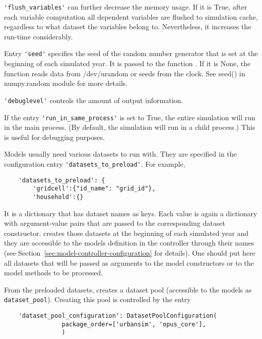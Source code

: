 \verb|'flush_variables'| can further decrease the memory usage.  If it is True, after each variable
computation all dependent variables are flushed to simulation
cache, regardless to what dataset the variables belong to.
Nevertheless, it increases the run-time considerably.

Entry \verb|'seed'| specifies the seed of the random number generator that is set at
the beginning of each simulated year. It is passed to the  
function . If it is None, the function reads data from /dev/urandom or 
seeds from the clock.  See seed() in numpy.random module for more details.

\verb|'debuglevel'| controls the amount of output information.

If the entry \verb|'run_in_same_process'| is set to True, the entire
simulation will run in the main process.  
(By default, the simulation will run in a child process.)  
This is useful for debugging purposes.

Models usually need various datasets to run with. They are specified in the
configuration entry \verb|'datasets_to_preload'|. For example,
\begin{verbatim}
    'datasets_to_preload': {
        'gridcell':{"id_name": "grid_id"},
        'household':{}
\end{verbatim}
It is a dictionary that has dataset names as keys. Each value is again a
dictionary with argument-value pairs that are passed to the corresponding
dataset constructor.  creates those datasets at the
beginning of each simulated year and they are accessible to the models 
definition in the controller through their names (see
Section~\ref{sec:model-controller-configuration} for details). One should put
here all datasets that will be passed as arguments to the model constructors
or to the model methods to be processed.

From the preloaded datasets,  creates a dataset pool (accessible
to the models as \verb|dataset_pool|). Creating this pool is controlled by
the entry
\begin{verbatim}
    'dataset_pool_configuration': DatasetPoolConfiguration(
                package_order=['urbansim', 'opus_core'],
                )
\end{verbatim}


